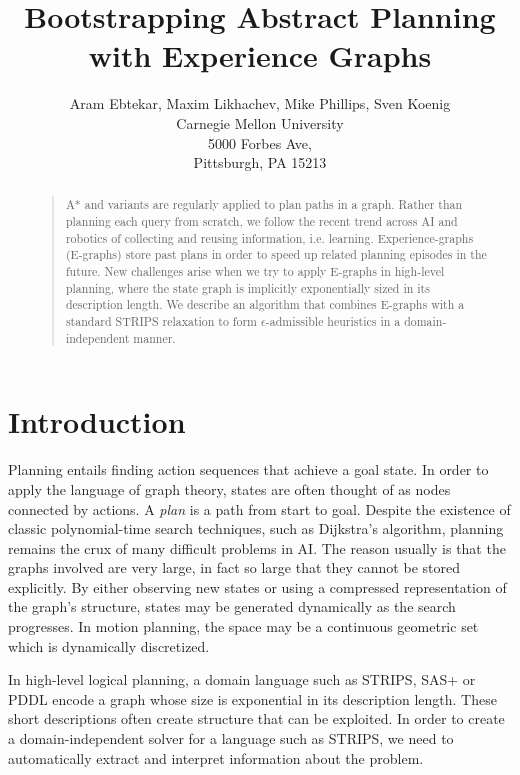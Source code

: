 \documentclass[letterpaper]{article}
\begin{document}
%
\title{Bootstrapping Abstract Planning with Experience Graphs}
\author{Aram Ebtekar, Maxim Likhachev, Mike Phillips, Sven Koenig\\
Carnegie Mellon University\\
5000 Forbes Ave,\\
Pittsburgh, PA 15213\\
}
\maketitle
\begin{abstract}
\begin{quote}
A* and variants are regularly applied to plan paths in a graph. Rather than planning each query from scratch, we follow the recent trend across AI and robotics of collecting and reusing information, i.e. learning. Experience-graphs (E-graphs) store past plans in order to speed up related planning episodes in the future. New challenges arise when we try to apply E-graphs in high-level planning, where the state graph is implicitly exponentially sized in its description length. We describe an algorithm that combines E-graphs with a standard STRIPS relaxation to form $\epsilon$-admissible heuristics in a domain-independent manner.
\end{quote}
\end{abstract}

\section{Introduction}
Planning entails finding action sequences that achieve a goal state.
In order to apply the language of graph theory, states are often thought of as nodes connected by actions.
A \textit{plan} is a path from start to goal.
Despite the existence of classic polynomial-time search techniques, such as Dijkstra's algorithm, planning remains the crux of many difficult problems in AI.
The reason usually is that the graphs involved are very large, in fact so large that they cannot be stored explicitly.
By either observing new states or using a compressed representation of the graph's structure, states may be generated dynamically as the search progresses.
In motion planning, the space may be a continuous geometric set which is dynamically discretized.

In high-level logical planning, a domain language such as STRIPS, SAS+ or PDDL encode a graph whose size is exponential in its description length. 
These short descriptions often create structure that can be exploited.
In order to create a domain-independent solver for a language such as STRIPS, we need to automatically extract and interpret information about the problem. 
\end{document}
